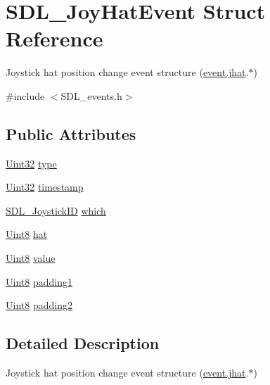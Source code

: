 \hypertarget{struct_s_d_l___joy_hat_event}{}\section{S\+D\+L\+\_\+\+Joy\+Hat\+Event Struct Reference}
\label{struct_s_d_l___joy_hat_event}


Joystick hat position change event structure (\hyperlink{union_s_d_l___event_a421b40e0f8e01f181c8d5548cff1dd1d}{event.\+jhat}.$\ast$)  




{\ttfamily \#include $<$S\+D\+L\+\_\+events.\+h$>$}

\subsection*{Public Attributes}
\begin{DoxyCompactItemize}
\item 
\hyperlink{_s_d_l__stdinc_8h_add440eff171ea5f55cb00c4a9ab8672d}{Uint32} \hyperlink{struct_s_d_l___joy_hat_event_ac583dafab46c44354e210a542aff57cc}{type}
\item 
\hyperlink{_s_d_l__stdinc_8h_add440eff171ea5f55cb00c4a9ab8672d}{Uint32} \hyperlink{struct_s_d_l___joy_hat_event_ade58ecb3e75aad4ef9809f040519a021}{timestamp}
\item 
\hyperlink{_s_d_l__joystick_8h_a3c3d32500cb08f76ee8077983912c0bd}{S\+D\+L\+\_\+\+Joystick\+ID} \hyperlink{struct_s_d_l___joy_hat_event_ac9d9bb179f9116d16b3da47cacd74b55}{which}
\item 
\hyperlink{_s_d_l__stdinc_8h_a2944638813a090aa23e62f4da842c3e2}{Uint8} \hyperlink{struct_s_d_l___joy_hat_event_ab1b54a6d1091e583e856f86b5af1e2f6}{hat}
\item 
\hyperlink{_s_d_l__stdinc_8h_a2944638813a090aa23e62f4da842c3e2}{Uint8} \hyperlink{struct_s_d_l___joy_hat_event_a52b179a34407449941b61d988ca72ef4}{value}
\item 
\hyperlink{_s_d_l__stdinc_8h_a2944638813a090aa23e62f4da842c3e2}{Uint8} \hyperlink{struct_s_d_l___joy_hat_event_afbe72b6702cf7f70ccbe206737ab2e49}{padding1}
\item 
\hyperlink{_s_d_l__stdinc_8h_a2944638813a090aa23e62f4da842c3e2}{Uint8} \hyperlink{struct_s_d_l___joy_hat_event_adaca3e99773130ae456690ba83feb420}{padding2}
\end{DoxyCompactItemize}


\subsection{Detailed Description}
Joystick hat position change event structure (\hyperlink{union_s_d_l___event_a421b40e0f8e01f181c8d5548cff1dd1d}{event.\+jhat}.$\ast$) 

